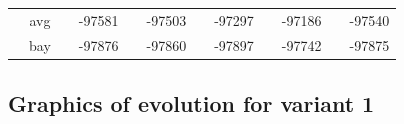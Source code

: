\documentclass[]{scrartcl}
\begin{document}
\begin{scriptsize}
\begin{center}
\begin{tabular}{cc|cc|cc|cc|cc|cc}
    												    & avg        & & -97581              & & -97503                  & & -97297                 & & -97186                  & & -97540 \\
                                                        & bay        & & -97876              & & -97860                  & & -97897                 & & -97742                 & & -97875 \\                                                                                                                
\end{tabular}
\end{center}
\end{scriptsize}


\subsection{Graphics of evolution for variant 1}
\end{document}
